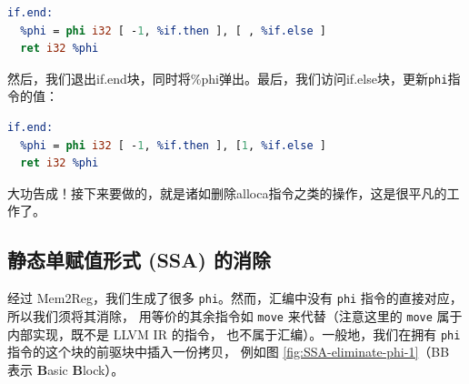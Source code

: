 \begin{lstlisting}[language=LLVM]
if.end:
  %phi = phi i32 [ -1, %if.then ], [ , %if.else ]
  ret i32 %phi
\end{lstlisting}

然后，我们退出if.end块，同时将\%phi弹出。最后，我们访问if.else块，更新\texttt{phi}指令的值：

\begin{lstlisting}[language=LLVM]
if.end:
  %phi = phi i32 [ -1, %if.then ], [1, %if.else ]
  ret i32 %phi
\end{lstlisting}

大功告成！接下来要做的，就是诸如删除alloca指令之类的操作，这是很平凡的工作了。

\subsection{静态单赋值形式 (SSA) 的消除} \label{SSA-eliminate-phi}

经过 Mem2Reg，我们生成了很多 \texttt{phi}。然而，汇编中没有 \texttt{phi} 指令的直接对应，所以我们须将其消除，
用等价的其余指令如 \texttt{move} 来代替（注意这里的 \texttt{move} 属于内部实现，既不是 LLVM IR 的指令，
也不属于汇编）。一般地，我们在拥有 \texttt{phi} 指令的这个块的前驱块中插入一份拷贝，
例如图 \ref{fig:SSA-eliminate-phi-1}（BB 表示 \textbf{B}asic \textbf{B}lock）。

